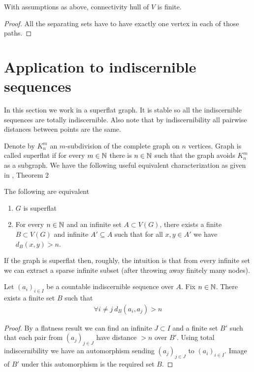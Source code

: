 \documentclass{amsart}
\begin{document}
\begin{Corollary}
	With assumptions as above, connectivity hull of $V$ is finite.
\end{Corollary}

\begin{proof}
	All the separating sets have to have exactly one vertex in each of those paths. 
\end{proof}

\section{Application to indiscernible sequences}

In this section we work in a superflat graph. It is stable so all the indiscernible sequences are totally indiscernible. Also note that by indiscernibility all pairwise distances between points are the same.

Denote by $K^m_n$ an $m$-subdivision of the complete graph on $n$ vertices. Graph is called superflat if for every $m \in \mathbb{N}$ there is $n \in \mathbb{N}$ such that the graph avoids $K^m_n$ as a subgraph. We have the following useful equivalent characterization as given in \cite{stable_graphs}, Theorem 2

\begin{Theorem}
	The following are equivalent
	\begin{enumerate}
		\item $G$ is superflat
		\item For every $n \in \mathbb{N}$ and an infinite set $A \subset V(G)$, there exists a finite $B \subset V(G)$ and infinite $A' \subseteq A$ such that for all $x,y \in A'$ we have $d_{B}(x, y) > n$.
	\end{enumerate}
\end{Theorem}

If the graph is superflat then, roughly, the intuition is that from every infinite set we can extract a sparse infinite subset (after throwing away finitely many nodes).


\begin{Lemma}
	Let $(a_i)_{i \in I}$ be a countable indiscernible sequence over $A$. Fix $n \in \mathbb{N}$. There exists a finite set $B$ such that
	\begin{align*}
		\forall i \neq j \ d_B(a_i, a_j) > n
	\end{align*}
\end{Lemma}

\begin{proof}
	By a flatness result we can find an infinite $J \subset I$ and a finite set $B'$ such that each pair from $(a_j)_{j \in J}$ have distance $>n$ over $B'$. Using total indiscernibility we have an automorphism sending $(a_j)_{j \in J}$ to $(a_i)_{i \in I}$. Image of $B'$ under this automorphism is the required set $B$.
\end{proof}
\end{document}
